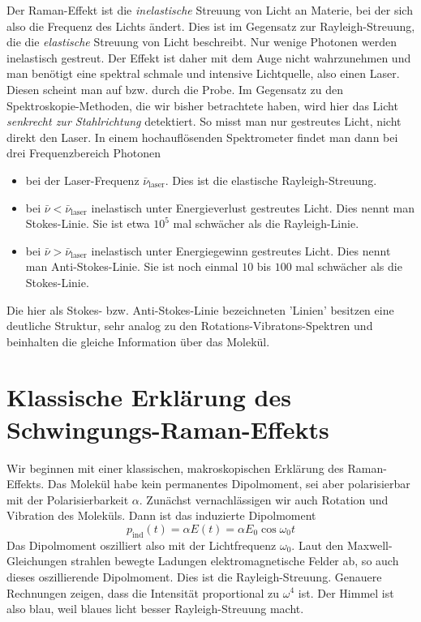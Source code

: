 Der Raman-Effekt ist die \emph{inelastische} Streuung von Licht an Materie, bei der sich also die Frequenz des Lichts ändert. Dies ist im Gegensatz zur Rayleigh-Streuung, die die \emph{elastische} Streuung von Licht beschreibt. Nur wenige Photonen werden inelastisch gestreut. Der Effekt ist daher mit dem Auge nicht wahrzunehmen und man benötigt eine spektral schmale und intensive Lichtquelle, also einen Laser. Diesen scheint man auf bzw. durch die Probe. Im Gegensatz zu den Spektroskopie-Methoden, die wir bisher betrachtete haben, wird hier das Licht \emph{senkrecht zur Stahlrichtung} detektiert. So misst man nur gestreutes Licht, nicht direkt den Laser. In einem hochauflösenden Spektrometer findet man dann bei drei Frequenzbereich Photonen
\begin{itemize} \setlength{\itemsep}{0pt}
\item bei der Laser-Frequenz $\bar{\nu}_\text{laser}$. Dies ist die elastische Rayleigh-Streuung.
\item bei $\bar{\nu} < \bar{\nu}_\text{laser}$ inelastisch unter Energieverlust  gestreutes Licht. Dies nennt man Stokes-Linie. Sie ist etwa $10^{5}$ mal schwächer als die Rayleigh-Linie.
\item bei $\bar{\nu} > \bar{\nu}_\text{laser}$ inelastisch unter Energiegewinn gestreutes Licht. Dies nennt man Anti-Stokes-Linie. Sie ist noch einmal $10$ bis $100$ mal schwächer als die Stokes-Linie.
\end{itemize}
Die hier als Stokes- bzw. Anti-Stokes-Linie bezeichneten 'Linien' besitzen eine deutliche Struktur, sehr analog zu den Rotations-Vibratons-Spektren und beinhalten die gleiche Information über das Molekül.


\section{Klassische Erklärung des Schwingungs-Raman-Effekts}

Wir beginnen mit einer klassischen, makroskopischen Erklärung des Raman-Effekts. Das Molekül habe kein permanentes Dipolmoment, sei aber polarisierbar mit der Polarisierbarkeit $\alpha$. Zunächst vernachlässigen wir auch Rotation und Vibration des Moleküls. Dann ist das induzierte Dipolmoment
\begin{equation}
p_\text{ind}(t) = \alpha E(t) = \alpha E_0 \cos \omega_0 t
\end{equation}
Das Dipolmoment oszilliert also mit der Lichtfrequenz $\omega_0$. Laut den Maxwell-Gleichungen strahlen bewegte Ladungen elektromagnetische Felder ab, so auch dieses oszillierende Dipolmoment. Dies ist die Rayleigh-Streuung. Genauere Rechnungen zeigen, dass die Intensität proportional zu $\omega^4$ ist. Der Himmel ist also blau, weil blaues licht besser Rayleigh-Streuung macht.

